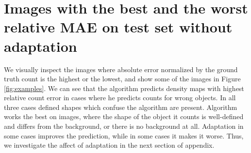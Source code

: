 \section{Images with the best and the worst relative MAE on test set without adaptation}
\label{app:no_adapt}

We visually inspect the images where absolute error normalized by the ground truth count is the highest or the lowest, and show some of the images in Figure \ref{fig:examples}. We can see that the algorithm predicts density maps with highest relative count error in cases where he predicts counts for wrong objects. In all three cases defined shapes which confuse the algorithm are present. Algorithm works the best on images, where the shape of the object it counts is well-defined and differs from the background, or there is no background at all. Adaptation in some cases improves the prediction, while in some cases it makes it worse. Thus, we investigate the affect of adaptation in the next section of appendix.

